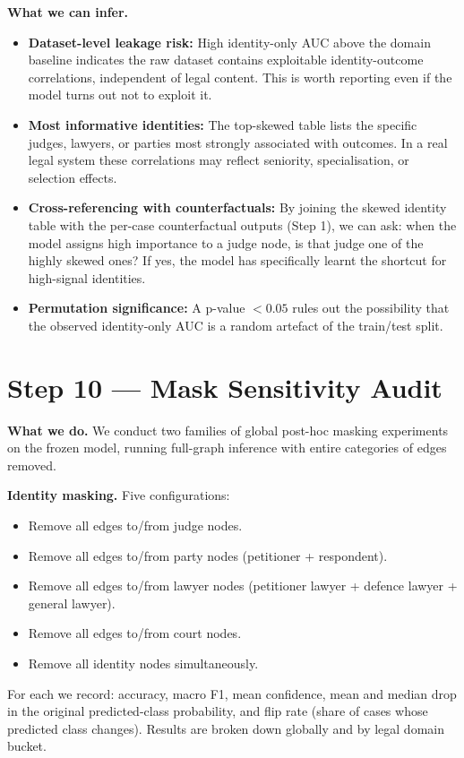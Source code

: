 \documentclass[11pt,a4paper]{article}
\begin{document}
\textbf{What we can infer.}
\begin{itemize}
  \item \textbf{Dataset-level leakage risk:} High identity-only AUC above the domain
    baseline indicates the raw dataset contains exploitable identity-outcome
    correlations, independent of legal content. This is worth reporting even if the
    model turns out not to exploit it.
  \item \textbf{Most informative identities:} The top-skewed table lists the specific
    judges, lawyers, or parties most strongly associated with outcomes. In a real legal
    system these correlations may reflect seniority, specialisation, or selection
    effects.
  \item \textbf{Cross-referencing with counterfactuals:} By joining the skewed identity
    table with the per-case counterfactual outputs (Step 1), we can ask: when the
    model assigns high importance to a judge node, is that judge one of the highly
    skewed ones? If yes, the model has specifically learnt the shortcut for high-signal
    identities.
  \item \textbf{Permutation significance:} A p-value $<0.05$ rules out the possibility
    that the observed identity-only AUC is a random artefact of the train/test split.
\end{itemize}

\bigskip

\section{Step 10 \texorpdfstring{\textcolor{stepgray}{---}}{---} Mask Sensitivity Audit}

\textbf{What we do.}
We conduct two families of global post-hoc masking experiments on the frozen model,
running full-graph inference with entire categories of edges removed.

\textbf{Identity masking.} Five configurations:
\begin{itemize}
  \item Remove all edges to/from judge nodes.
  \item Remove all edges to/from party nodes (petitioner + respondent).
  \item Remove all edges to/from lawyer nodes (petitioner lawyer + defence lawyer
    + general lawyer).
  \item Remove all edges to/from court nodes.
  \item Remove all identity nodes simultaneously.
\end{itemize}
For each we record: accuracy, macro F1, mean confidence, mean and median drop in the
original predicted-class probability, and flip rate (share of cases whose predicted
class changes). Results are broken down globally and by legal domain bucket.
\end{document}
